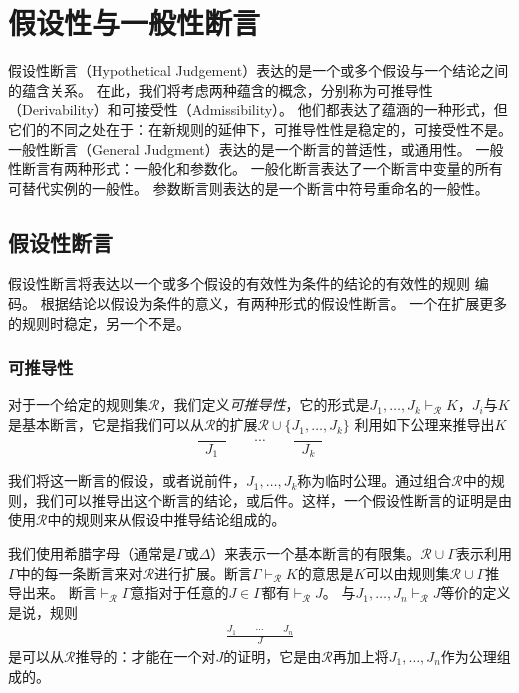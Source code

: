 \chapter{假设性与一般性断言}

假设性断言（Hypothetical Judgement）表达的是一个或多个假设与一个结论之间的蕴含关系。
在此，我们将考虑两种蕴含的概念，分别称为可推导性（Derivability）和可接受性（Admissibility）。
他们都表达了蕴涵的一种形式，但它们的不同之处在于：在新规则的延伸下，可推导性性是稳定的，可接受性不是。
一般性断言（General Judgment）表达的是一个断言的普适性，或通用性。
一般性断言有两种形式：一般化和参数化。
一般化断言表达了一个断言中变量的所有可替代实例的一般性。
参数断言则表达的是一个断言中符号重命名的一般性。

\section{假设性断言}

假设性断言将表达以一个或多个假设的有效性为条件的结论的有效性的规则 编码。 
根据结论以假设为条件的意义，有两种形式的假设性断言。
一个在扩展更多的规则时稳定，另一个不是。

\subsection{可推导性}

对于一个给定的规则集$\mathcal{R}$，我们定义\textit{可推导性}，它的形式是$J_1,\dots,J_k\vdash_\mathcal{R}K $，$J_i$与$K$是基本断言，它是指我们可以从$\mathcal{R}$的扩展$\mathcal{R}\cup \{J_1,\dots,J_k\}$ 利用如下公理来推导出$K$
$$\frac{\qquad}{J_1} \qquad \cdots \qquad \frac{\qquad}{J_k}$$

我们将这一断言的假设，或者说前件，$J_1,\dots,J_k$称为临时公理。通过组合$\mathcal{R}$中的规则，我们可以推导出这个断言的结论，或后件。这样，一个假设性断言的证明是由使用$\mathcal{R}$中的规则来从假设中推导结论组成的。

我们使用希腊字母（通常是$\Gamma$或$\Delta$）来表示一个基本断言的有限集。$\mathcal{R}\cup\Gamma$表示利用$\Gamma$中的每一条断言来对$\mathcal{R}$进行扩展。断言$\Gamma \vdash_\mathcal{R}K$的意思是$K$可以由规则集$\mathcal{R}\cup\Gamma$推导出来。
断言$\vdash_\mathcal{R}\Gamma$意指对于任意的$J\in \Gamma$都有$\vdash_\mathcal{R}J$。
与$J_1,\dots,J_n\vdash_\mathcal{R}J$等价的定义是说，规则
\begin{equation}
    \begin{aligned} %
        \frac{J_1\qquad\cdots\qquad J_n}{J} \label{equation:three_one}
    \end{aligned}
\end{equation}
是可以从$\mathcal{R}$推导的：才能在一个对$J$的证明，它是由$\mathcal{R}$再加上将$J_1,\dots,J_n$作为公理组成的。

